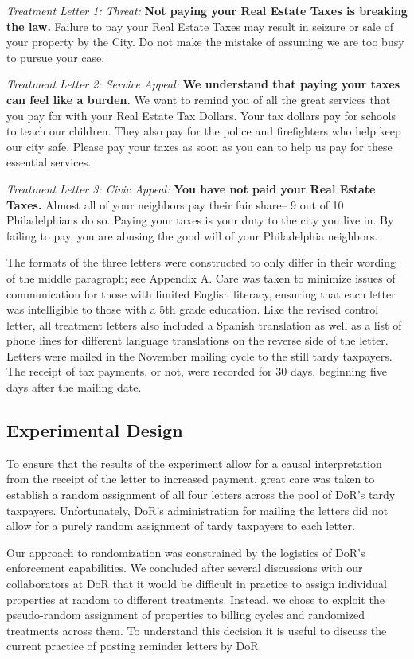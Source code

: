 \documentclass[12pt,titlepage]{article}
\begin{document}
{\it Treatment Letter 1: Threat: } {\bf Not paying your Real Estate
  Taxes is breaking the law.} Failure to pay your Real Estate Taxes
may result in seizure or sale of your property by the City. Do not
make the mistake of assuming we are too busy to pursue your case.

{\it Treatment Letter 2: Service Appeal: } {\bf We understand that
  paying your taxes can feel like a burden.} We want to remind you of
all the great services that you pay for with your Real Estate Tax
Dollars. Your tax dollars pay for schools to teach our children.  They
also pay for the police and firefighters who help keep our city safe.
Please pay your taxes as soon as you can to help us pay for these
essential services.
  
{ \it Treatment Letter 3: Civic Appeal: } {\bf You have not paid your
  Real Estate Taxes.}  Almost all of your neighbors pay their fair
share-- 9 out of 10 Philadelphians do so. Paying your taxes is your
duty to the city you live in. By failing to pay, you are abusing the
good will of your Philadelphia neighbors.

The formats of the three letters were constructed to only differ in
their wording of the middle paragraph; see Appendix A.  Care was taken
to minimize issues of communication for those with limited English
literacy, ensuring that each letter was intelligible to those with a
5th grade education.  Like the revised control letter, all treatment
letters also included a Spanish translation as well as a list of phone
lines for different language translations on the reverse side of the
letter.  Letters were mailed in the November mailing cycle to the
still tardy taxpayers.  The receipt of tax payments, or not, were
recorded for 30 days, beginning five days after the mailing date.


\subsection{Experimental Design}

To ensure that the results of the experiment allow for a causal
interpretation from the receipt of the letter to increased payment,
great care was taken to establish a random assignment of all four
letters across the pool of DoR's tardy taxpayers.  Unfortunately,
DoR's administration for mailing the letters did not allow for a
purely random assignment of tardy taxpayers to each letter.  

Our approach to randomization was constrained by the logistics of
DoR's enforcement capabilities. We concluded after several discussions
with our collaborators at DoR that it would be difficult in practice
to assign individual properties at random to different
treatments. Instead, we chose to exploit the pseudo-random assignment
of properties to billing cycles and randomized treatments across them.
To understand this decision it is useful to discuss the current
practice of posting reminder letters by DoR.
\end{document}
